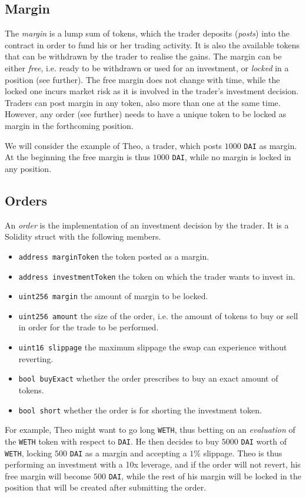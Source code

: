 \documentclass [10pt, fancyhdr, twoside] {article}
\begin{document}
\subsection{Margin}
The \textit{margin} is a lump sum of tokens, which the trader deposits (\textit{posts}) into the contract in order to fund his or her trading activity. It is also the available tokens that can be withdrawn by the trader to realise the gains. The margin can be either \textit{free}, i.e. ready to be withdrawn or used for an investment, or \textit{locked} in a position (see further). The free margin does not change with time, while the locked one incurs market risk as it is involved in the trader's investment decision.
Traders can post margin in any token, also more than one at the same time. However, any order (see further) needs to have a unique token to be locked as margin in the forthcoming position.

We will consider the example of Theo, a trader, which posts $1000$ \verb|DAI| as margin. At the beginning the free margin is thus $1000$ \verb|DAI|, while no margin is locked in any position.

\subsection{Orders}\label{orderSubsection}
An \textit{order} is the implementation of an investment decision by the trader. It is a Solidity struct with the following members.
\begin{itemize}
\item \verb|address marginToken| the token posted as a margin.
\item \verb|address investmentToken| the token on which the trader wants to invest in.
\item \verb|uint256 margin| the amount of margin to be locked.
\item \verb|uint256 amount| the size of the order, i.e. the amount of tokens to buy or sell in order for the trade to be performed.
\item \verb|uint16 slippage| the maximum slippage the swap can experience without reverting.
\item \verb|bool buyExact| whether the order prescribes to buy an exact amount of tokens.
\item \verb|bool short| whether the order is for shorting the investment token.
\end{itemize}

For example, Theo might want to go long \verb|WETH|, thus betting on an \emph{evaluation} of the \verb|WETH| token with respect to \verb|DAI|. He then decides to buy $5000$ \verb|DAI| worth of \verb|WETH|, locking $500$ \verb|DAI| as a margin and accepting a $1$\% slippage. Theo is thus performing an investment with a 10x leverage, and if the order will not revert, his free margin will become $500$ \verb|DAI|, while the rest of his margin will be locked in the position that will be created after submitting the order.
\end{document}
